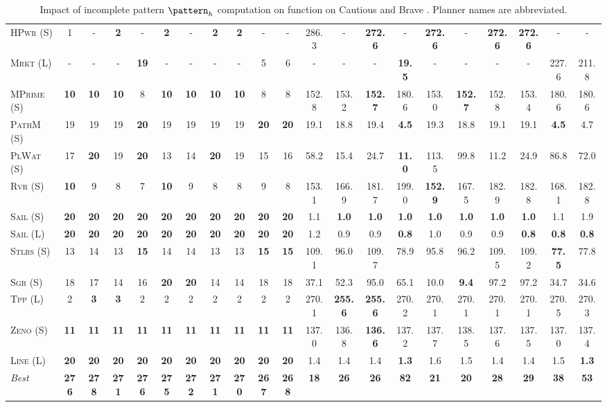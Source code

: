 \begin{table}[tb]
{\begin{tabular}{|l||cccccccccc||cccccccccc||}
\textsc{HPwr} (S)&1&-&\textbf{2}&-&\textbf{2}&-&\textbf{2}&\textbf{2}&-&-&286.3&-&\textbf{272.6}&-&\textbf{272.6}&-&\textbf{272.6}&\textbf{272.6}&-&-\\
\textsc{Mrkt} (L)&-&-&-&\textbf{19}&-&-&-&-&5&6&-&-&-&\textbf{19.5}&-&-&-&-&227.6&211.8\\
\textsc{MPrime} (S)&\textbf{10}&\textbf{10}&\textbf{10}&8&\textbf{10}&\textbf{10}&\textbf{10}&\textbf{10}&8&8&152.8&153.2&\textbf{152.7}&180.6&153.0&\textbf{152.7}&152.8&153.4&180.6&180.6\\
\textsc{PathM} (S)&19&19&19&\textbf{20}&19&19&19&19&\textbf{20}&\textbf{20}&19.1&18.8&19.4&\textbf{4.5}&19.3&18.8&19.1&19.1&\textbf{4.5}&4.7\\
\textsc{PlWat} (S)&17&\textbf{20}&19&\textbf{20}&13&14&\textbf{20}&19&15&16&58.2&15.4&24.7&\textbf{11.0}&113.5&99.8&11.2&24.9&86.8&72.0\\
\textsc{Rvr} (S)&\textbf{10}&9&8&7&\textbf{10}&9&8&8&9&8&153.1&166.9&181.7&199.0&\textbf{152.9}&167.5&182.9&182.8&168.1&182.8\\
\textsc{Sail} (S)&\textbf{20}&\textbf{20}&\textbf{20}&\textbf{20}&\textbf{20}&\textbf{20}&\textbf{20}&\textbf{20}&\textbf{20}&\textbf{20}&1.1&\textbf{1.0}&\textbf{1.0}&\textbf{1.0}&\textbf{1.0}&\textbf{1.0}&\textbf{1.0}&\textbf{1.0}&1.1&1.9\\
\textsc{Sail} (L)&\textbf{20}&\textbf{20}&\textbf{20}&\textbf{20}&\textbf{20}&\textbf{20}&\textbf{20}&\textbf{20}&\textbf{20}&\textbf{20}&1.2&0.9&0.9&\textbf{0.8}&1.0&0.9&0.9&\textbf{0.8}&\textbf{0.8}&\textbf{0.8}\\
\textsc{Stlrs} (S)&13&14&13&\textbf{15}&14&14&13&13&\textbf{15}&\textbf{15}&109.1&96.0&109.7&78.9&95.8&96.2&109.5&109.2&\textbf{77.5}&77.8\\
\textsc{Sgr} (S)&18&17&14&16&\textbf{20}&\textbf{20}&14&14&18&18&37.1&52.3&95.0&65.1&10.0&\textbf{9.4}&97.2&97.2&34.7&34.6\\
\textsc{Tpp} (L)&2&\textbf{3}&\textbf{3}&2&2&2&2&2&2&2&270.1&\textbf{255.6}&\textbf{255.6}&270.2&270.1&270.1&270.1&270.1&270.5&270.3\\
\textsc{Zeno} (S)&\textbf{11}&\textbf{11}&\textbf{11}&\textbf{11}&\textbf{11}&\textbf{11}&\textbf{11}&\textbf{11}&\textbf{11}&\textbf{11}&137.0&136.8&\textbf{136.6}&137.2&137.7&138.5&137.6&137.5&137.0&137.4\\
\textsc{Line} (L)&\textbf{20}&\textbf{20}&\textbf{20}&\textbf{20}&\textbf{20}&\textbf{20}&\textbf{20}&\textbf{20}&\textbf{20}&\textbf{20}&1.4&1.4&1.4&\textbf{1.3}&1.6&1.5&1.4&1.4&1.5&\textbf{1.3}
\\\hline
\textit{Best}&\textbf{276}&\textbf{278}&\textbf{271}&\textbf{276}&\textbf{275}&\textbf{272}&\textbf{271}&\textbf{270}&\textbf{267}&\textbf{268}&\textbf{18}&\textbf{26}&\textbf{26}&\textbf{82}&\textbf{21}&\textbf{20}&\textbf{28}&\textbf{29}&\textbf{38}&\textbf{53}\\\hline

        \end{tabular}}
        \caption{Impact of incomplete pattern $\pattern_h$ computation on function on Cautious and Brave \pattyd. Planner names are abbreviated.}
        \label{tab:abl-patternh-incomplete}
        \end{table}
        